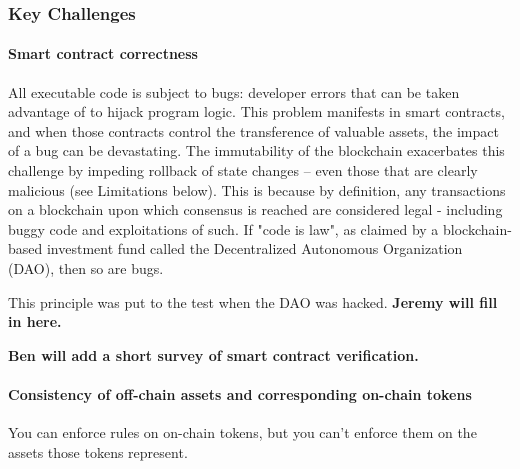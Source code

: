 {\subsubsection{Key Challenges}
\paragraph{Smart contract correctness}
All executable code is subject to bugs: developer errors that can be taken advantage of to hijack program logic. This problem manifests in smart contracts, and when those contracts control the transference of valuable assets, the impact of a bug can be devastating. The immutability of the blockchain exacerbates this challenge by impeding rollback of state changes -- even those that are clearly malicious (see Limitations below). This is because by definition, any transactions on a blockchain upon which consensus is reached are considered legal - including buggy code and exploitations of such. If "code is law", as claimed by a blockchain-based investment fund called the Decentralized Autonomous Organization (DAO), then so are bugs. 

This principle was put to the test when the DAO was hacked.  \textbf{Jeremy will fill in here.} 


\textbf{Ben will add a short survey of smart contract verification.}



\paragraph{Consistency of off-chain assets and corresponding on-chain tokens}
You can enforce rules on on-chain tokens, but you can't enforce them on the assets those tokens represent. 

}
